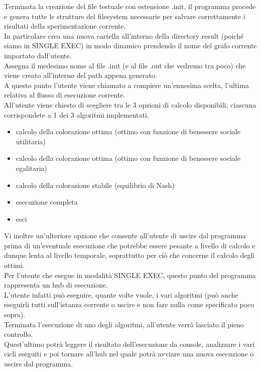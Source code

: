 Terminata la creazione del file testuale con estensione .init, il programma procede e genera tutte le strutture del filesystem necessarie per salvare correttamente i risultati della sperimentazione corrente.\\
In particolare crea una nuova cartella all'interno della directory result (poiché siamo in SINGLE EXEC) in modo dinamico prendendo il nome del grafo corrente importato dall'utente.\\
Assegna il medesimo nome al file .init (e al file .out che vedremo tra poco) che viene creato all'interno del path appena generato.\\

A questo punto l'utente viene chiamato a compiere un'ennesima scelta, l'ultima relativa al flusso di esecuzione corrente.\\
All'utente viene chiesto di scegliere tra le 3 opzioni di calcolo disponibili, ciascuna corrispondete a 1 dei 3 algoritmi implementati.

\begin{itemize}
	\item calcolo della colorazione ottima (ottimo con funzione di benessere sociale utilitaria)
	\item calcolo della colorazione ottima (ottimo con funzione di benessere sociale egalitaria)
	\item calcolo della colorazione stabile (equilibrio di Nash)
	\item esecuzione completa
	\item esci
\end{itemize}

Vi inoltre un'ulteriore opzione che consente all'utente di uscire dal programma prima di un'eventuale esecuzione che potrebbe essere pesante a livello di calcolo e dunque lenta al livello temporale, soprattutto per ciò che concerne il calcolo degli ottimi.\\

Per l'utente che esegue in modalità SINGLE EXEC, questo punto del programma rappresenta un hub di esecuzione.\\
L'utente infatti può eseguire, quante volte vuole, i vari algoritmi (può anche eseguirli tutti sull'istanza corrente o uscire e non fare nulla come specificato poco sopra).\\
Terminata l'esecuzione di uno degli algoritmi, all'utente verrà lasciato il pieno controllo.\\
Quest'ultimo potrà leggere il risultato dell'esecuzione da console, analizzare i vari cicli eseguiti e poi tornare all'hub nel quale potrà avviare una nuova esecuzione o uscire dal programma.\\

